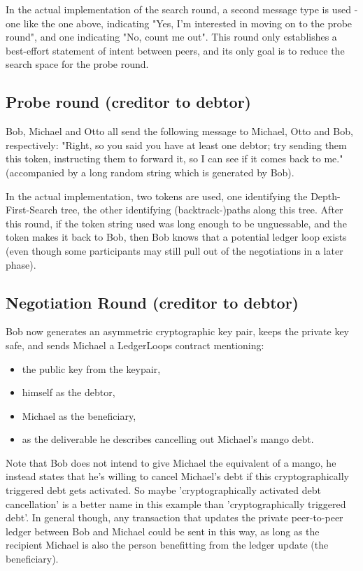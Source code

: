 \documentclass[11pt,twoside,a4paper]{article}
\begin{document}
In the actual implementation of the
search round, a second message type is used - one like the one above, indicating "Yes, I'm interested in moving on to the probe round",
and one indicating "No, count me out". 
This round only establishes a best-effort statement of intent between peers, and its only
goal is to reduce the search space for the probe round.

\subsection{Probe round (creditor to debtor)}
Bob, Michael and Otto all send the following message to Michael, Otto and Bob, respectively:
"Right, so you said you have at least one debtor; try sending them this token, instructing them to forward it,
so I can see if it comes back to me." (accompanied by a long random string which is generated by Bob).

In the actual implementation, two tokens are used, one identifying the Depth-First-Search tree, the other identifying
(backtrack-)paths along this tree.
After this round, if the token string used was long enough to be unguessable, and the token makes it back to Bob,
then Bob knows that a potential ledger loop exists (even though some participants may still pull out of the negotiations
in a later phase).

\subsection{Negotiation Round (creditor to debtor)}
Bob now generates an asymmetric cryptographic key pair, keeps the private key safe, and sends Michael
a LedgerLoops contract mentioning:
\begin{itemize}
\item the public key from the keypair,
\item himself as the debtor,
\item Michael as the beneficiary,
\item as the deliverable he describes cancelling out Michael's mango debt.
\end{itemize}

Note that Bob does not intend to give Michael the equivalent of a mango, he instead states that he's willing to cancel
Michael's debt if this cryptographically triggered debt gets activated. So maybe 'cryptographically activated debt cancellation'
 is a better name in this example than 'cryptographically triggered debt'. In general though, any transaction that updates the
private peer-to-peer ledger between Bob and Michael could be sent in this way, as long as the recipient Michael is also the person
benefitting from the ledger update (the beneficiary).
\end{document}
